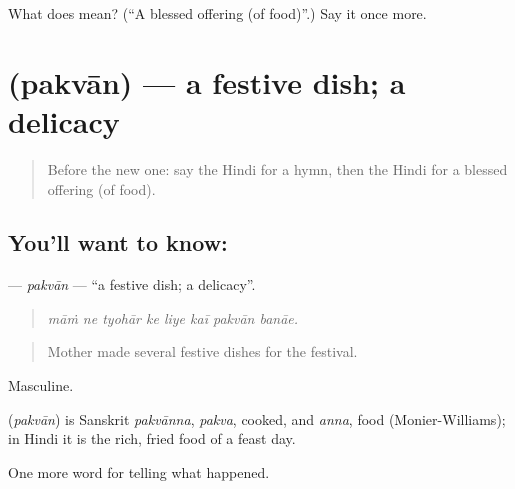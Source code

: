 \begin{tcolorbox}[breakable,colback=teal!4,colframe=teal!35!black,title={Before you move on}]
What does  mean? (\textquotedblleft{}A blessed offering (of food)\textquotedblright{}.) Say it once more.
\end{tcolorbox}
\section[\texorpdfstring{\hi{पकवान} (pakvān)}{पकवान (pakvān)}]{ (pakvān) — a festive dish; a delicacy}

\label{lesson:HI-C331-pakvan}



\begin{quote}
Before the new one: say the Hindi for a hymn, then the Hindi for a blessed offering (of food).
\end{quote}

\subsection*{You'll want to know: }
\textbf{} — \emph{pakvān} — \textquotedblleft{}a festive dish; a delicacy\textquotedblright{}.

\begin{quote}
       
\end{quote}

\begin{quote}
\emph{māṁ ne tyohār ke liye kaī pakvān banāe.}
\end{quote}

\begin{quote}
Mother made several festive dishes for the festival.
\end{quote}

Masculine.

\begin{cousinweb}
\textbf{} (\emph{pakvān}) is Sanskrit \emph{pakvānna}, \emph{pakva}, cooked, and \emph{anna}, food (Monier-Williams); in Hindi it is the rich, fried food of a feast day.
\end{cousinweb}

\begin{grammarlens}[title={What you've built}]
One more word for telling what happened.
\end{grammarlens}

